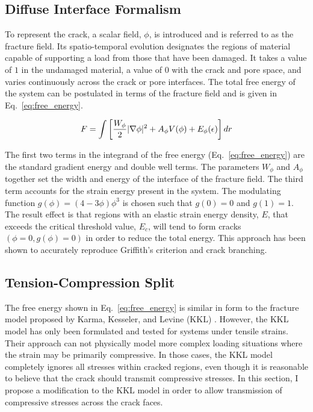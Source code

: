 \subsection{Diffuse Interface Formalism}
 
To represent the crack, a scalar field, $\phi$, is introduced and is referred to as the fracture field. Its spatio-temporal evolution designates the regions of material capable of supporting a load from those that have been damaged. It takes a value of $1$ in the undamaged material, a value of $0$ with the crack and pore space, and varies continuously across the crack or pore interfaces. The total free energy of the system can be postulated in terms of the fracture field and is given in Eq.~\ref{eq:free_energy}.

\begin{align}\label{eq:free_energy}
F = \int \left[ \frac{W_{\phi}}{2}|\nabla\phi|^2 + A_{\phi}V(\phi) + E_\phi(\epsilon)\right]dr	
\end{align}

The first two terms in the integrand of the free energy (Eq.~\ref{eq:free_energy}) are the standard gradient energy and double well terms. The parameters $W_{\phi}$ and $A_{\phi}$ together set the width and energy of the interface of the fracture field. The third term accounts for the strain energy present in the system. The modulating function $g(\phi) = (4-3\phi)\phi^3$ is chosen such that $g(0)=0$ and $g(1)=1$. The result effect is that regions with an elastic strain energy density, $E$, that exceeds the critical threshold value, $E_c$, will tend to form cracks $(\phi=0, g(\phi)=0)$ in order to reduce the total energy. This approach has been shown to accurately reproduce Griffith's criterion and crack branching.

\subsection{Tension-Compression Split} \label{sec:elastic_split}

The free energy shown in Eq.~\ref{eq:free_energy} is similar in form to the fracture model proposed by Karma, Kesseler, and Levine (KKL) \cite{Karma2001}\cite{Henry2004}. However, the KKL model has only been formulated and tested for systems under tensile strains. Their approach can not physically model more complex loading situations where the strain may be primarily compressive. In those cases, the KKL model completely ignores all stresses within cracked regions, even though it is reasonable to believe that the crack should transmit compressive stresses. In this section, I propose a modification to the KKL model in order to allow transmission of compressive stresses across the crack faces.

